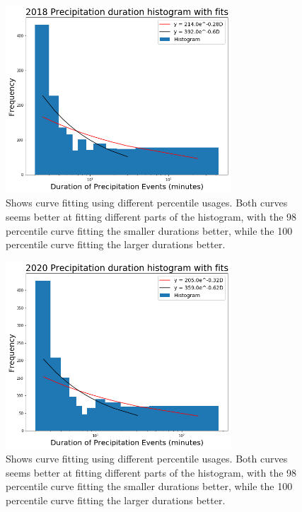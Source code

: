 \documentclass[11pt]{report}
\begin{document}
\clearpage
\begin{figure}[t]
	\centering
	\includegraphics[width=0.75\textwidth]{Figures/precip18_new.png}
	\caption[2018 Exponentials with contrasting curve fitting]
	{\label{precip18_redone}
	 Shows curve fitting using different percentile usages. Both curves seems better at fitting different parts of the histogram, with the 98 percentile curve fitting the smaller durations better, while the 100 percentile curve fitting the larger durations better. }
\end{figure}
\begin{figure}[b]
	\centering
	\includegraphics[width=0.75\textwidth]{Figures/precip20_new.png}
	\caption[2020 Exponentials with contrasting curve fitting]
	{\label{precip20_redone}
		Shows curve fitting using different percentile usages. Both curves seems better at fitting different parts of the histogram, with the 98 percentile curve fitting the smaller durations better, while the 100 percentile curve fitting the larger durations better. }
\end{figure}
\end{document}
